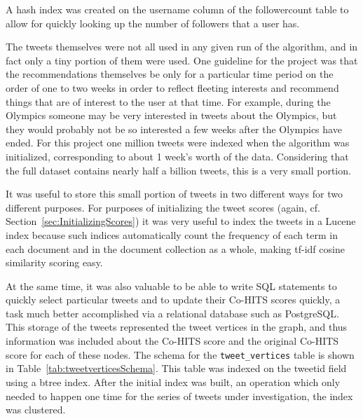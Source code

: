 \noindent
A hash index was created on the username column of the followercount table to allow for quickly looking up the number of followers that a user has.

The tweets themselves were not all used in any given run of the algorithm, and in fact only a tiny portion of them were used. One guideline for the project was that the recommendations themselves be only for a particular time period on the order of one to two weeks in order to reflect fleeting interests and recommend things that are of interest to the user at that time. For example, during the Olympics someone may be very interested in tweets about the Olympics, but they would probably not be so interested a few weeks after the Olympics have ended. For this project one million tweets were indexed when the algorithm was initialized, corresponding to about 1 week's worth of the data. Considering that the full dataset contains nearly half a billion tweets, this is a very small portion.

It was useful to store this small portion of tweets in two different ways for two different purposes. For purposes of initializing the tweet scores (again, cf. Section~\ref{sec:InitializingScores}) it was very useful to index the tweets in a Lucene index because such indices automatically count the frequency of each term in each document and in the document collection as a whole, making tf-idf cosine similarity scoring easy.

At the same time, it was also valuable to be able to write SQL statements to quickly select particular tweets and to update their Co-HITS scores quickly, a task much better accomplished via a relational database such as PostgreSQL. This storage of the tweets represented the tweet vertices in the graph, and thus information was included about the Co-HITS score and the original Co-HITS score for each of these nodes. The schema for the \texttt{tweet\_vertices} table is shown in Table~\ref{tab:tweetverticesSchema}. This table was indexed on the tweetid field using a btree index. After the initial index was built, an operation which only needed to happen one time for the series of tweets under investigation, the index was clustered.

